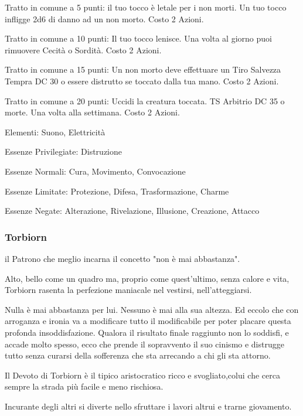 \documentclass[a4paper,11pt,twoside,openany]{book}
\begin{document}
\bigskip

Tratto in comune a 5 punti: il tuo tocco è letale per i non morti. Un tuo tocco infligge 2d6 di danno ad un non morto. Costo 2 Azioni.

Tratto in comune a 10 punti: Il tuo tocco lenisce. Una volta al giorno puoi rimuovere Cecità o Sordità. Costo 2 Azioni.

Tratto in comune a 15 punti: Un non morto deve effettuare un Tiro Salvezza Tempra DC 30 o essere distrutto se toccato dalla tua mano. Costo 2 Azioni.

Tratto in comune a 20 punti: Uccidi la creatura toccata. TS Arbitrio DC 35 o morte. Una volta alla settimana. Costo 2 Azioni.

\bigskip

Elementi: Suono, Elettricità

\bigskip

Essenze Privilegiate: Distruzione

Essenze Normali: Cura, Movimento, Convocazione

Essenze Limitate: Protezione, Difesa, Trasformazione, Charme

Essenze Negate: Alterazione, Rivelazione, Illusione, Creazione, Attacco

\subsubsection{Torbiorn}

\label{torbiorn}

il Patrono che meglio incarna il concetto "non è mai abbastanza".

Alto, bello come un quadro ma, proprio come quest'ultimo, senza calore e vita, Torbiorn rasenta la perfezione maniacale nel vestirsi, nell'atteggiarsi.

Nulla è mai abbastanza per lui. Nessuno è mai alla sua altezza. Ed eccolo che con arroganza e ironia va a modificare tutto il modificabile per poter placare questa profonda insoddisfazione. Qualora il risultato finale raggiunto non lo soddisfi, e accade molto spesso, ecco che prende il sopravvento il suo cinismo e distrugge tutto senza curarsi della sofferenza che sta arrecando a chi gli sta attorno.

Il Devoto di Torbiorn è il tipico aristocratico ricco e svogliato,colui che cerca sempre la strada più facile e meno rischiosa.

Incurante degli altri si diverte nello sfruttare i lavori altrui e trarne giovamento.
\end{document}

